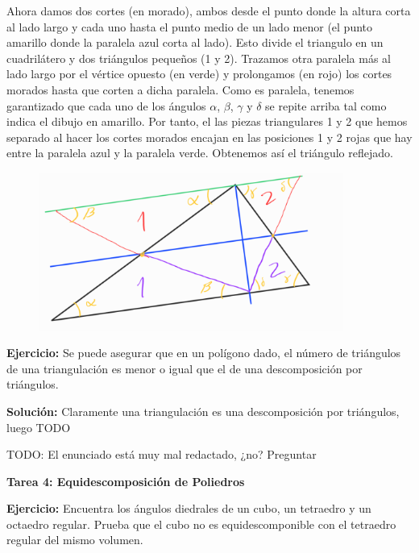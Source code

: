 \documentclass{amsart}
\begin{document}
Ahora damos dos cortes (en morado), ambos desde el punto donde la altura corta al lado largo y cada uno hasta el punto medio de un lado menor (el punto amarillo donde la paralela azul corta al lado). Esto divide el triangulo en un cuadrilátero y dos triángulos pequeños (1 y 2). Trazamos otra paralela más al lado largo por el vértice opuesto (en verde) y prolongamos (en rojo) los cortes morados hasta que corten a dicha paralela. Como es paralela, tenemos garantizado que cada uno de los ángulos $\alpha$, $\beta$, $\gamma$ y $\delta$ se repite arriba tal como indica el dibujo en amarillo. Por tanto, el las piezas triangulares 1 y 2 que hemos separado al hacer los cortes morados encajan en las posiciones 1 y 2 rojas que hay entre la paralela azul y la paralela verde. Obtenemos así el triángulo reflejado.

\begin{figure}[H]
	\includegraphics[width=100mm]{imgs/reflejar-triangulo}
\end{figure}


\bigskip

\textbf{Ejercicio:} Se puede asegurar que en un polígono dado, el número de
triángulos de una triangulación es menor o igual que el de una
descomposición por triángulos.

\bigskip

\textbf{Solución:} Claramente una triangulación es una descomposición por triángulos, luego TODO

TODO: El enunciado está muy mal redactado, ¿no? Preguntar

\bigskip
\begin{center}
	\textbf{\large Tarea 4: Equidescomposición de Poliedros}
\end{center}
\bigskip

\textbf{Ejercicio:} Encuentra los ángulos diedrales de un cubo, un tetraedro y un octaedro
regular. Prueba que el cubo no es equidescomponible con el tetraedro regular
del mismo volumen.

\bigskip
\end{document}
